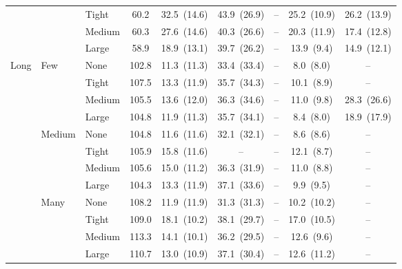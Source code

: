 \begin{table}[htbp]
{\begin{tabular}{lll c ccccc}
 &  & {\small Tight} & 60.2 & 32.5~{\scriptsize(14.6)} & 43.9~{\scriptsize(26.9)} & -- & 25.2~{\scriptsize(10.9)} & 26.2~{\scriptsize(13.9)} \\
 &  & {\small Medium} & 60.3 & 27.6~{\scriptsize(14.6)} & 40.3~{\scriptsize(26.6)} & -- & 20.3~{\scriptsize(11.9)} & 17.4~{\scriptsize(12.8)} \\
 &  & {\small Large} & 58.9 & 18.9~{\scriptsize(13.1)} & 39.7~{\scriptsize(26.2)} & -- & 13.9~{\scriptsize(9.4)} & 14.9~{\scriptsize(12.1)} \\
\midrule
\multirow{12}{*}{\small Long} & \multirow{4}{*}{\small Few} & {\small None} & 102.8 & 11.3~{\scriptsize(11.3)} & 33.4~{\scriptsize(33.4)} & -- & 8.0~{\scriptsize(8.0)} & -- \\
 &  & {\small Tight} & 107.5 & 13.3~{\scriptsize(11.9)} & 35.7~{\scriptsize(34.3)} & -- & 10.1~{\scriptsize(8.9)} & -- \\
 &  & {\small Medium} & 105.5 & 13.6~{\scriptsize(12.0)} & 36.3~{\scriptsize(34.6)} & -- & 11.0~{\scriptsize(9.8)} & 28.3~{\scriptsize(26.6)} \\
 &  & {\small Large} & 104.8 & 11.9~{\scriptsize(11.3)} & 35.7~{\scriptsize(34.1)} & -- & 8.4~{\scriptsize(8.0)} & 18.9~{\scriptsize(17.9)} \\
 & \multirow{4}{*}{\small Medium} & {\small None} & 104.8 & 11.6~{\scriptsize(11.6)} & 32.1~{\scriptsize(32.1)} & -- & 8.6~{\scriptsize(8.6)} & -- \\
 &  & {\small Tight} & 105.9 & 15.8~{\scriptsize(11.6)} & -- & -- & 12.1~{\scriptsize(8.7)} & -- \\
 &  & {\small Medium} & 105.6 & 15.0~{\scriptsize(11.2)} & 36.3~{\scriptsize(31.9)} & -- & 11.0~{\scriptsize(8.8)} & -- \\
 &  & {\small Large} & 104.3 & 13.3~{\scriptsize(11.9)} & 37.1~{\scriptsize(33.6)} & -- & 9.9~{\scriptsize(9.5)} & -- \\
 & \multirow{4}{*}{\small Many} & {\small None} & 108.2 & 11.9~{\scriptsize(11.9)} & 31.3~{\scriptsize(31.3)} & -- & 10.2~{\scriptsize(10.2)} & -- \\
 &  & {\small Tight} & 109.0 & 18.1~{\scriptsize(10.2)} & 38.1~{\scriptsize(29.7)} & -- & 17.0~{\scriptsize(10.5)} & -- \\
 &  & {\small Medium} & 113.3 & 14.1~{\scriptsize(10.1)} & 36.2~{\scriptsize(29.5)} & -- & 12.6~{\scriptsize(9.6)} & -- \\
 &  & {\small Large} & 110.7 & 13.0~{\scriptsize(10.9)} & 37.1~{\scriptsize(30.4)} & -- & 12.6~{\scriptsize(11.2)} & -- \\
\bottomrule
\end{tabular}%
}
\end{table}

